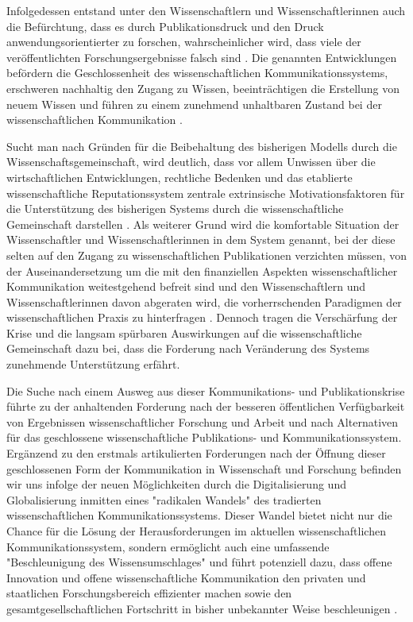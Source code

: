 Infolgedessen entstand unter den Wissenschaftlern und Wissenschaftlerinnen auch die Befürchtung, dass es durch Publikationsdruck und den Druck anwendungsorientierter zu forschen, wahrscheinlicher wird, dass viele der veröffentlichten Forschungsergebnisse falsch sind \cite{Ioannidis_2005}. Die genannten Entwicklungen befördern die Geschlossenheit des wissenschaftlichen Kommunikationssystems, erschweren nachhaltig den Zugang zu Wissen, beeinträchtigen die Erstellung von neuem Wissen \cite{Willinsky_2006} \cite{Feyerabend_1986} \cite{Luhmann_1998} und führen zu einem zunehmend unhaltbaren Zustand bei der wissenschaftlichen Kommunikation \cite{Schekman_2013}.

Sucht man nach Gründen für die Beibehaltung des bisherigen Modells durch die Wissenschaftsgemeinschaft, wird deutlich, dass vor allem Unwissen über die wirtschaftlichen Entwicklungen, rechtliche Bedenken und das etablierte wissenschaftliche Reputationssystem zentrale extrinsische Motivationsfaktoren für die Unterstützung des bisherigen Systems durch die wissenschaftliche Gemeinschaft darstellen \cite{Herb_2015}. Als weiterer Grund wird die komfortable Situation der Wissenschaftler und Wissenschaftlerinnen in dem System genannt, bei der diese selten auf den Zugang zu wissenschaftlichen Publikationen verzichten müssen, von der Auseinandersetzung um die mit den finanziellen Aspekten wissenschaftlicher Kommunikation weitestgehend befreit sind \cite{Sietmann_2007} \cite{Hanekop_2006} und den Wissenschaftlern und Wissenschaftlerinnen davon abgeraten wird, die vorherrschenden Paradigmen der wissenschaftlichen Praxis zu hinterfragen \cite{Siegfried_2013} \cite{Loeb_2013}. Dennoch tragen die Verschärfung der Krise und die langsam spürbaren Auswirkungen auf die wissenschaftliche Gemeinschaft dazu bei, dass die Forderung nach Veränderung des Systems zunehmende Unterstützung erfährt.

Die Suche nach einem Ausweg aus dieser Kommunikations- und Publikationskrise führte zu der anhaltenden Forderung nach der besseren öffentlichen Verfügbarkeit von Ergebnissen wissenschaftlicher Forschung und Arbeit und nach Alternativen für das geschlossene wissenschaftliche Publikations- und Kommunikationssystem. Ergänzend zu den erstmals artikulierten Forderungen nach der Öffnung dieser geschlossenen Form der Kommunikation in Wissenschaft und Forschung befinden wir uns infolge der neuen Möglichkeiten durch die Digitalisierung und Globalisierung inmitten eines "radikalen Wandels" \cite{Poynder_2011} des tradierten wissenschaftlichen Kommunikationssystems. Dieser Wandel bietet nicht nur die Chance für die Lösung der Herausforderungen im aktuellen wissenschaftlichen Kommunikationssystem, sondern ermöglicht auch eine umfassende "Beschleunigung des Wissensumschlages" \cite[:540]{Giesecke_1991} und führt potenziell dazu, dass offene Innovation und offene wissenschaftliche Kommunikation den privaten und staatlichen Forschungsbereich effizienter machen \cite{Chesbrough_2006} sowie den gesamtgesellschaftlichen Fortschritt in bisher unbekannter Weise beschleunigen \cite{Chesbrough_2003}.

